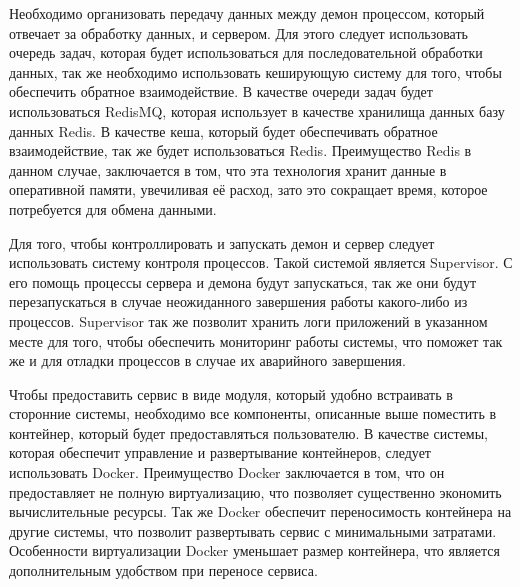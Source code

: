 Необходимо организовать передачу данных между демон процессом, который отвечает за обработку данных, и сервером. Для этого следует использовать очередь задач, которая будет использоваться для последовательной обработки данных, так же необходимо использовать кеширующую систему для того, чтобы обеспечить обратное взаимодействие. В качестве очереди задач будет использоваться RedisMQ, которая использует в качестве хранилища данных базу данных Redis. В качестве кеша, который будет обеспечивать обратное взаимодействие, так же будет использоваться Redis. Преимущество Redis в данном случае, заключается в том, что эта технология хранит данные в оперативной памяти, увечиливая её расход, зато это сокращает время, которое потребуется для обмена данными.

Для того, чтобы контроллировать и запускать демон и сервер следует использовать систему контроля процессов. Такой системой является Supervisor. С его помощь процессы сервера и демона будут запускаться, так же они будут перезапускаться в случае неожиданного завершения работы какого-либо из процессов. Supervisor так же позволит хранить логи приложений в указанном месте для того, чтобы обеспечить мониторинг работы системы, что поможет так же и для отладки процессов в случае их аварийного завершения.

Чтобы предоставить сервис в виде модуля, который удобно встраивать в сторонние системы, необходимо все компоненты, описанные выше поместить в контейнер, который будет предоставляться пользователю. В качестве системы, которая обеспечит управление и развертывание контейнеров, следует использовать Docker. Преимущество Docker заключается в том, что он предоставляет не полную виртуализацию, что позволяет существенно экономить вычислительные ресурсы. Так же Docker обеспечит переносимость контейнера на другие системы, что позволит развертывать сервис с минимальными затратами. Особенности виртуализации Docker уменьшает размер контейнера, что является дополнительным удобством при переносе сервиса.
